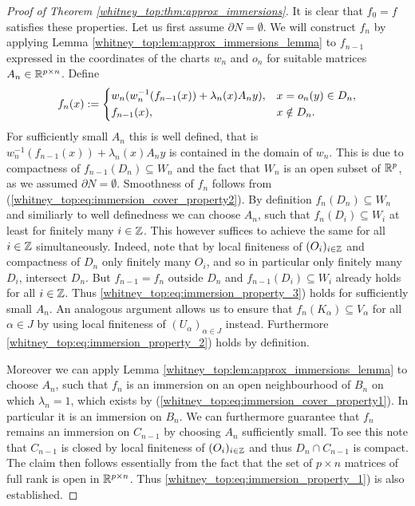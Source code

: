 \begin{proof}[Proof of Theorem \ref{whitney_top:thm:approx_immersions}]
    It is clear that $f_0 = f$ satisfies these properties. Let us first assume $\partial N = \emptyset$. We will construct $f_n$ by applying Lemma \ref{whitney_top:lem:approx_immersions_lemma} to $f_{n-1}$ expressed in the coordinates of the charts $w_n$ and $o_n$ for suitable matrices $A_n \in \mathbb{R}^{p \times n}$. Define
    \[
    f_n(x) := \begin{dcases}
        w_n(w_n^{-1}(f_{n-1}(x)) + \lambda_n(x)A_ny), & x = o_n(y) \in D_n, \\
        f_{n-1}(x), & x \notin D_n.
    \end{dcases}
    \]
    For sufficiently small $A_n$ this is well defined, that is
    $w_n^{-1}(f_{n-1}(x)) + \lambda_n(x)A_ny$ is contained in the domain of $w_n$. This is due to compactness of $f_{n-1}(D_n) \subseteq W_n$ and the fact that $W_n$ is an open subset of $\mathbb{R}^p$, as we assumed $\partial N = \emptyset$. Smoothness of $f_n$ follows from (\ref{whitney_top:eq:immersion_cover_property2}). By definition $f_n(D_n) \subseteq W_n$ and similiarly to well definedness we can choose $A_n$, such that $f_n(D_i) \subseteq W_i$ at least for finitely many $i \in \mathbb{Z}$. This however suffices to achieve the same for all $i \in \mathbb{Z}$ simultaneously. Indeed, note that by local finiteness of $(O_i)_{i \in \mathbb{Z}}$ and compactness of $D_n$ only finitely many $O_i$, and so in particular only finitely many $D_i$, intersect $D_n$. But $f_{n-1} = f_n$ outside $D_n$ and $f_{n-1}(D_i) \subseteq W_i$ already holds for all $i \in \mathbb{Z}$. Thus \ref{whitney_top:eq:immersion_property_3}) holds for sufficiently small $A_n$. An analogous argument allows us to ensure that $f_n(K_\alpha) \subseteq V_\alpha$ for all $\alpha \in J$ by using local finiteness of $(U_\alpha)_{\alpha \in J}$ instead. Furthermore \ref{whitney_top:eq:immersion_property_2}) holds by definition.
    
    Moreover we can apply Lemma \ref{whitney_top:lem:approx_immersions_lemma} to choose $A_n$, such that $f_n$ is an immersion on an open neighbourhood of $B_n$ on which $\lambda_n = 1$, which exists by (\ref{whitney_top:eq:immersion_cover_property1}). In particular it is an immersion on $B_n$. We can furthermore guarantee that $f_n$ remains an immersion on $C_{n-1}$ by choosing $A_n$ sufficiently small. To see this note that $C_{n-1}$ is closed by local finiteness of $(O_i)_{i \in \mathbb{Z}}$ and thus $D_n \cap C_{n-1}$ is compact. The claim then follows essentially from the fact that the set of $p \times n$ matrices of full rank is open in $\mathbb{R}^{p \times n}$. Thus \ref{whitney_top:eq:immersion_property_1}) is also established.


\end{proof}
